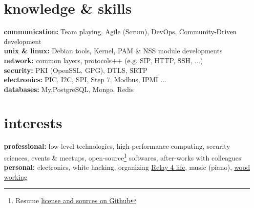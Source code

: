 \documentclass[]{friggeri-cv} %
\begin{document}
\section{knowledge \& skills}

\textbf{communication:} Team playing, Agile (Scrum), DevOps, Community-Driven development \\
\textbf{unix \& linux:} Debian tools, Kernel, PAM \& NSS module developments \\
\textbf{network:} common layers, protocols++ (e.g. SIP, HTTP, SSH, ...) \\
\textbf{security:} PKI (OpenSSL, GPG), DTLS, SRTP \\ 
\textbf{electronics:} PIC, I2C, SPI, Step 7, Modbus, IPMI ... \\
\textbf{databases:} {My,Postgre}SQL, Mongo, Redis \\
 


\section{interests}

\textbf{professional:} low-level technologies, high-performance computing, security sciences, events \& meetups, open-source\footnote{Resume \href{https://github.com/rmedaer/me}{license and sources on Github}} softwares, after-works with colleagues \\
\textbf{personal:} electronics, white hacking, organizing \href{http://www.relaispourlavie.be/relays/braine-lalleud-2017#block-views-stkrfl-contacts-main-block-1}{Relay 4 life}, music (piano), \href{https://www.lairdubois.fr/pas-a-pas/268-meuble-tv-chester-2.html}{wood working}
\end{document}
